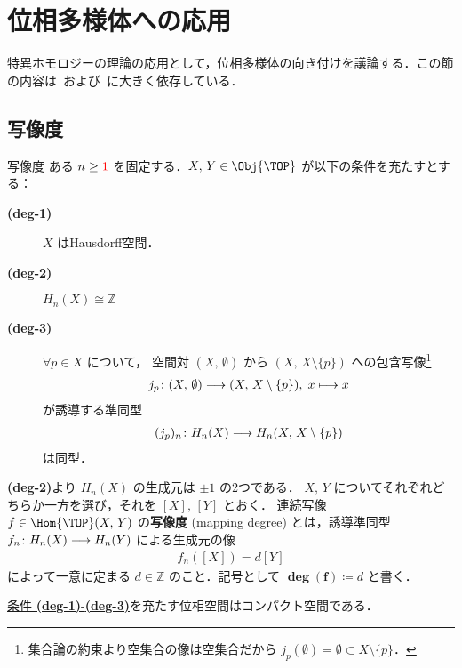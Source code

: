 \documentclass[algtopo_main]{subfiles}
\begin{document}
\section{位相多様体への応用}

特異ホモロジーの理論の応用として，位相多様体の向き付けを議論する．この節の内容は~\cite[第4章]{Nariya}および~\cite[Appendix A]{Milnor}に大きく依存している．

\subsection{写像度}

\begin{mydef}[label=def:degree, breakable]{写像度}
    ある $n \ge \textcolor{red}{1}$ を固定する．$X,\, Y \in \Obj{\TOP}$ が以下の条件を充たすとする：
    \begin{description}
        \item[\textbf{(deg-1)}] $X$ はHausdorff空間．
        \item[\textbf{(deg-2)}] $H_n(X) \cong \mathbb{Z}$
        \item[\textbf{(deg-3)}] $\forall p \in X$ について，
        空間対 $(X,\, \emptyset)$ から $(X,\, X \setminus \{p\})$ への包含写像\footnote{集合論の約束より空集合の像は空集合だから $j_p(\emptyset) = \emptyset \subset X \setminus \{p\}$．}
        \begin{align}
            j_p \colon (X,\, \emptyset) \longrightarrow (X,\, X \setminus \{p\}),\; x \longmapsto x
        \end{align}
        が誘導する準同型 
        \begin{align}
            (j_p)_n \colon H_n(X) \longrightarrow H_n(X,\, X\setminus \{p\})
        \end{align}
        は同型．
    \end{description}
    \textsf{\textbf{(deg-2)}}より $H_n(X)$ の生成元は $\pm 1$ の2つである．
    $X,\, Y$ についてそれぞれどちらか一方を選び，それを $[X],\, [Y]$ とおく．
    \tcblower
    連続写像 $f \in \Hom{\TOP}(X,\, Y)$ の\textbf{写像度} (mapping degree) とは，誘導準同型 $f_n \colon H_n(X) \longrightarrow H_n(Y)$ による生成元の像
    \begin{align}
        f_n([X]) = d[Y] 
    \end{align}
    によって一意に定まる $d \in \mathbb{Z}$ のこと．記号として $\bm{\deg (f)} \coloneqq d$ と書く．
\end{mydef}

\begin{mylem}[label=lem:condition-deg-compact]{}
    \hyperref[def:degree]{条件 \textbf{\textsf{(deg-1)}}-\textbf{\textsf{(deg-3)}}}を充たす位相空間はコンパクト空間である．
\end{mylem}
\end{document}
